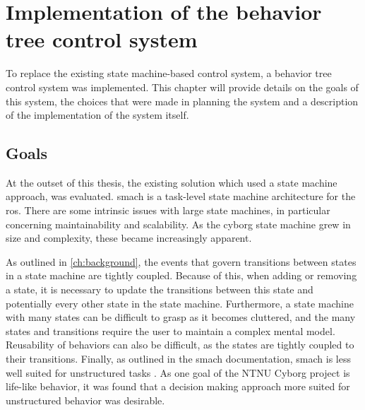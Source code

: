\documentclass[\rootfolder/main.tex]{subfiles}
\begin{document}
\chapter{Implementation of the behavior tree control system} %
\label{ch:implementation-control} %

To replace the existing state machine-based control system, a behavior tree control system was implemented.
This chapter will provide details on the goals of this system, the choices that were made in planning the system and a description of the implementation of the system itself.


\section{Goals}

At the outset of this thesis, the existing solution which used a state machine approach, was evaluated.
\acrshort{smach} is a task-level state machine architecture for the \acrfull{ros}.
There are some intrinsic issues with large state machines, in particular concerning maintainability and scalability.
As the cyborg state machine grew in size and complexity, these became increasingly apparent.

As outlined in \cref{ch:background}, the events that govern transitions between states in a state machine are tightly coupled.
Because of this, when adding or removing a state, it is necessary to update the transitions between this state and potentially every other state in the state machine.
Furthermore, a state machine with many states can be difficult to grasp as it becomes cluttered, and the many states and transitions require the user to maintain a complex mental model.
Reusability of behaviors can also be difficult, as the states are tightly coupled to their transitions.
Finally, as outlined in the \acrshort{smach} documentation, \acrshort{smach} is less well suited for unstructured tasks \cite{Bohren}.
As one goal of the NTNU Cyborg project is life-like behavior, it was found that a decision making approach more suited for unstructured behavior was desirable.

\end{document}
